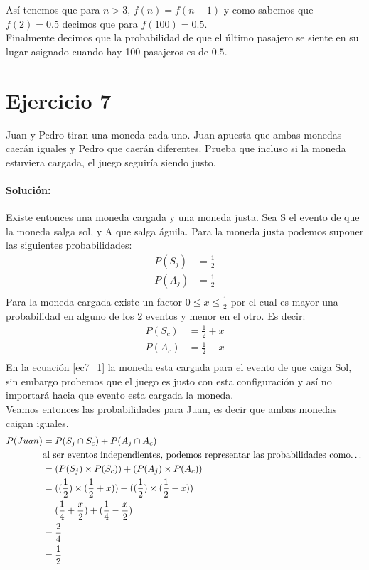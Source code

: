\documentclass[12pt]{article}
\begin{document}
Así tenemos que para $n>3$, $f(n) = f(n-1)$ y como sabemos que $f(2)=0.5$ decimos que para $f(100) = 0.5$.\\
Finalmente decimos que la probabilidad de que el último pasajero se siente en su lugar asignado cuando hay 100 pasajeros es de $0.5$.
\section{Ejercicio 7}
Juan y Pedro tiran una moneda cada uno. Juan apuesta que ambas monedas caerán iguales
y Pedro que caerán diferentes. Prueba que incluso si la moneda estuviera cargada, el juego
seguiría siendo justo.\\
\paragraph{Solución:} Existe entonces una moneda cargada y una moneda justa. Sea S el evento de que la moneda salga sol, y A que salga águila. Para la moneda justa podemos suponer las siguientes probabilidades:
\begin{equation}
	\begin{split}
		P(S_j) &= \frac{1}{2}\\
		P(A_j) &= \frac{1}{2}\\
	\end{split}
\end{equation}
Para la moneda cargada existe un factor $0 \leq x \leq \frac{1}{2}$ por el cual es mayor una probabilidad en alguno de los 2 eventos y menor en el otro. Es decir:
\begin{equation}\label{ec7_1}
\begin{split}
P(S_c) &= \frac{1}{2} + x\\
P(A_c) &= \frac{1}{2} - x\\
\end{split}
\end{equation}
En la ecuación \ref{ec7_1} la moneda esta cargada para el evento de que caiga Sol, sin embargo probemos que el juego es justo con esta configuración y así no importará hacia que evento esta cargada la moneda.\\
Veamos entonces las probabilidades para Juan, es decir que ambas monedas caigan iguales.\\
\begin{equation}\label{ec7_2}
\begin{split}
P(Juan) &= P(S_j\cap S_c) + P(A_j\cap A_c)\\
&\text{al ser eventos independientes, podemos representar las probabilidades como\dots}\\
 &= (P(S_j) \times P(S_c)) + (P(A_j) \times P(A_c))\\
 &= ((\frac{1}{2}) \times (\frac{1}{2} + x)) + ((\frac{1}{2}) \times (\frac{1}{2} - x))\\
 &= (\frac{1}{4} + \frac{x}{2}) + (\frac{1}{4} - \frac{x}{2})\\
 &= \frac{2}{4}\\
 &= \frac{1}{2}\\
\end{split}
\end{equation}
\end{document}
